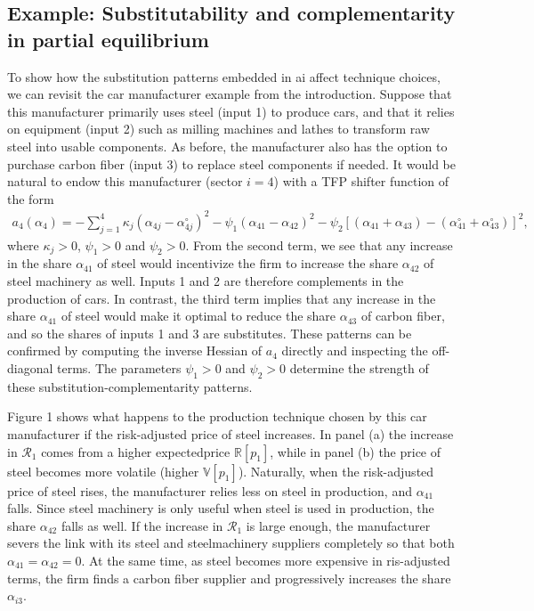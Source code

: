 \documentclass[11pt]{article}
\theoremstyle{definition}
\begin{document}
	\subsection*{Example: Substitutability and complementarity in partial equilibrium}
	To show how the substitution patterns embedded in ai affect technique choices, we can revisit the car manufacturer example from the introduction. Suppose that this manufacturer primarily uses steel (input 1) to produce cars, and that it relies on equipment (input 2) such as milling machines and lathes to transform raw steel into usable components. As before, the manufacturer also has the option to purchase carbon fiber (input 3) to replace steel components if needed. It would be natural to endow this manufacturer (sector $i = 4$) with a TFP shifter function of the form
	\begin{align}
		a_4(\alpha_4) = -\sum\limits_{j=1}^4 \kappa_j (\alpha_{4j} - \alpha_{4j}^{\circ})^2 - \psi_1(\alpha_{41}-\alpha_{42})^2 - \psi_2[(\alpha_{41} + \alpha_{43}) - (\alpha_{41}^{\circ} + \alpha_{43}^{\circ})]^2,
	\end{align}
	where $\kappa_j>0$, $\psi_1>0$ and $\psi_2>0$. From the second term, we see that any increase in the share $\alpha_{41}$ of steel would incentivize the firm to increase the share $\alpha_{42}$ of steel machinery as well. Inputs 1 and 2 are therefore complements in the production of cars. In contrast, the third term implies that any increase in the share $\alpha_{41}$ of steel would make it optimal to reduce the share $\alpha_{43}$ of carbon fiber, and so the shares of inputs 1 and 3 are substitutes. These patterns can be confirmed by computing the inverse Hessian of $a_4$ directly and inspecting the off-diagonal terms. The parameters $\psi_1>0$ and $\psi_2 > 0$ determine the strength of these substitution-complementarity patterns.
	
	Figure 1 shows what happens to the production technique chosen by this car manufacturer if the risk-adjusted price of steel increases. In panel (a) the increase in $\mathcal{R}_1$ comes from a higher expectedprice $\mathbb{R}[p_1]$, while in panel (b) the price of steel becomes more volatile (higher $\mathbb{V}[p_1]$). Naturally, when the risk-adjusted price of steel rises, the manufacturer relies less on steel in production, and $\alpha_{41}$ falls. Since steel machinery is only useful when steel is used in production, the share $\alpha_{42}$ falls as well. If the increase in $\mathcal{R}_1$ is large enough, the manufacturer severs the link with its steel and steelmachinery suppliers completely so that both $\alpha_{41} = \alpha_{42} = 0$. At the same time, as steel becomes more expensive in ris-adjusted terms, the firm finds a carbon fiber supplier and progressively increases the share $\alpha_{i3}$.
	
\end{document}
